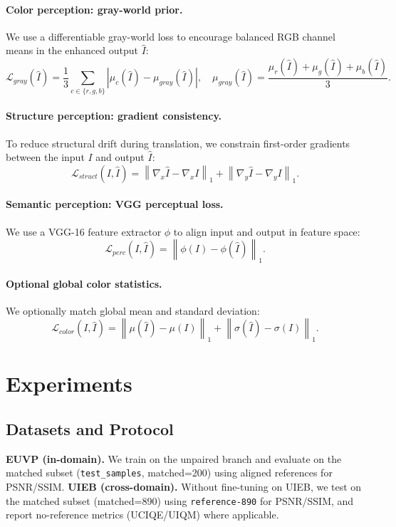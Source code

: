 \documentclass[11pt,a4paper]{article}
\begin{document}
\paragraph{Color perception: gray-world prior.}
We use a differentiable gray-world loss to encourage balanced RGB channel means in the enhanced output $\hat{I}$:
\begin{equation}
\mathcal{L}_{gray}(\hat{I})=\frac{1}{3}\sum_{c\in\{r,g,b\}}\left|\mu_c(\hat{I})-\mu_{gray}(\hat{I})\right|,\quad
\mu_{gray}(\hat{I})=\frac{\mu_r(\hat{I})+\mu_g(\hat{I})+\mu_b(\hat{I})}{3}.
\end{equation}
\paragraph{Structure perception: gradient consistency.}
To reduce structural drift during translation, we constrain first-order gradients between the input $I$ and output $\hat{I}$:
\begin{equation}
\mathcal{L}_{struct}(I,\hat{I})=\left\|\nabla_x \hat{I}-\nabla_x I\right\|_1+\left\|\nabla_y \hat{I}-\nabla_y I\right\|_1.
\end{equation}
\paragraph{Semantic perception: VGG perceptual loss.}
We use a VGG-16 feature extractor $\phi$ to align input and output in feature space:
\begin{equation}
\mathcal{L}_{perc}(I,\hat{I})=\left\|\phi(I)-\phi(\hat{I})\right\|_1.
\end{equation}
\paragraph{Optional global color statistics.}
We optionally match global mean and standard deviation:
\begin{equation}
\mathcal{L}_{color}(I,\hat{I})=\left\|\mu(\hat{I})-\mu(I)\right\|_1+\left\|\sigma(\hat{I})-\sigma(I)\right\|_1.
\end{equation}
\section{Experiments}
\subsection{Datasets and Protocol}
\textbf{EUVP (in-domain).} We train on the unpaired branch and evaluate on the matched subset (\texttt{test\_samples}, matched=200) using aligned references for PSNR/SSIM.
\textbf{UIEB (cross-domain).} Without fine-tuning on UIEB, we test on the matched subset (matched=890) using \texttt{reference-890} for PSNR/SSIM, and report no-reference metrics (UCIQE/UIQM) where applicable.
\end{document}

